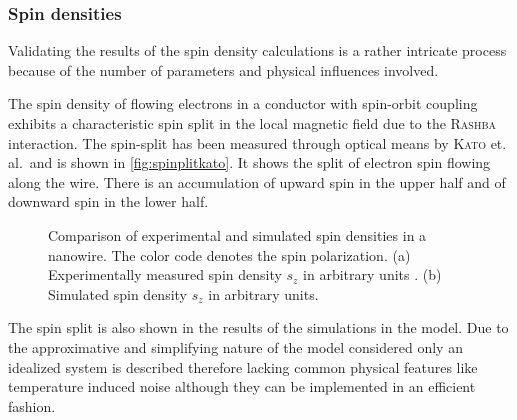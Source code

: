\subsubsection{Spin densities}
Validating the results of the spin density calculations is a rather intricate process because of the number of parameters and physical influences involved.\par
The spin density of flowing electrons in a conductor with spin-orbit coupling exhibits a characteristic spin split in the local magnetic field due to the \textsc{Rashba} interaction. The spin-split has been measured through optical means by \textsc{Kato} et. al.\,\cite{Kato2004Science} and is shown in \cref{fig:spinplitkato}. It shows the split of electron spin flowing along the wire. There is an accumulation of upward spin in the upper half and of downward spin in the lower half.
\begin{figure}[h]
  \begin{center}
    \qquad
    \qquad
    \caption{Comparison of experimental and simulated spin densities in a nanowire. The color code denotes the spin polarization. (a) Experimentally measured spin density $s_z$ in arbitrary units \cite{Kato2004Science}. (b) Simulated spin density $s_z$ in arbitrary units.}
  \end{center}
\end{figure}
The spin split is also shown in the results of the simulations in the \gfnc{} model. Due to the approximative and simplifying nature of the model considered only an idealized system is described therefore lacking common physical features like temperature induced noise although they can be implemented in an efficient fashion.\par
\FloatBarrier
